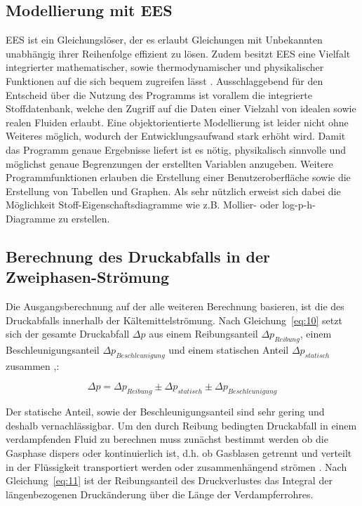 \subsection{Modellierung mit EES}
\label{subsec:Modellierung mit EES}

EES ist ein Gleichungslöser, der es erlaubt Gleichungen mit Unbekannten unabhängig ihrer Reihenfolge effizient zu lösen. Zudem besitzt EES eine Vielfalt integrierter mathematischer, sowie thermodynamischer und physikalischer Funktionen auf die sich bequem zugreifen lässt \cite{Klein.2000}. Ausschlaggebend für den Entscheid über die Nutzung des Programms ist vorallem die integrierte Stoffdatenbank, welche den Zugriff auf die Daten einer Vielzahl von idealen sowie realen Fluiden erlaubt. Eine objektorientierte Modellierung ist leider nicht ohne Weiteres möglich, wodurch der Entwicklungsaufwand stark erhöht wird. Damit das Programm genaue Ergebnisse liefert ist es nötig, physikalisch sinnvolle und möglichst genaue Begrenzungen der erstellten Variablen anzugeben. 
Weitere Programmfunktionen erlauben die Erstellung einer Benutzeroberfläche sowie die Erstellung von Tabellen und Graphen. Als sehr nützlich erweist sich dabei die Möglichkeit Stoff-Eigenschaftsdiagramme wie z.B. Mollier- oder log-p-h-Diagramme zu erstellen.



\subsection{Berechnung des Druckabfalls in der Zweiphasen-Strömung}
\label{subsec:Berechnung des Druckabfalls in der Zweiphasen-Strömung}

Die Ausgangsberechnung auf der alle weiteren Berechnung basieren, ist die des Druckabfalls innerhalb der Kältemittelströmung.
Nach Gleichung~\ref{eq:10} setzt sich der gesamte Druckabfall $\Delta p$ aus einem Reibungsanteil $\Delta p_{Reibung}$, einem Beschleunigungsanteil $\Delta p_{Beschleunigung}$ und einem statischen Anteil $\Delta p_{statisch}$ zusammen \cite{SpringerVerlagGmbH.2013},\cite{J.MichaelDoster.}:

\begin{equation}
\label{eq:10}
\Delta p =  \Delta p_{Reibung} \pm \Delta p_{statisch} \pm \Delta p_{Beschleunigung}
\end{equation}

Der statische Anteil, sowie der Beschleunigungsanteil sind sehr gering und deshalb vernachlässigbar. Um den durch Reibung bedingten Druckabfall in einem verdampfenden Fluid zu berechnen muss zunächst bestimmt werden ob die Gasphase dispers oder kontinuierlich ist, d.h. ob Gasblasen getrennt und verteilt in der Flüssigkeit transportiert werden oder zusammenhängend strömen \cite{Kesper.1976}. Nach Gleichung~\ref{eq:11} ist der Reibungsanteil des Druckverlustes das Integral der längenbezogenen Druckänderung über die Länge der Verdampferrohres.


